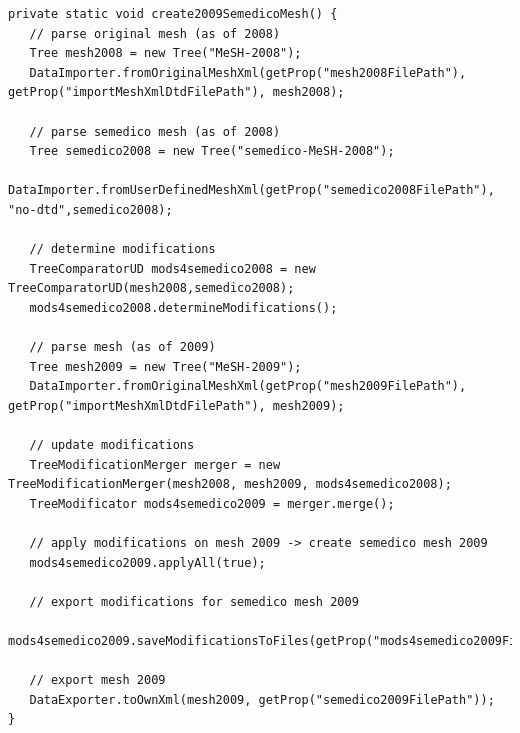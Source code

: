 \lstset{caption=Erstellen des Semedico-MeSH-2009,%
label=lst:create2009SemedicoMesh}
\begin{lstlisting}[float=htbp]
private static void create2009SemedicoMesh() {
   // parse original mesh (as of 2008)
   Tree mesh2008 = new Tree("MeSH-2008");
   DataImporter.fromOriginalMeshXml(getProp("mesh2008FilePath"), getProp("importMeshXmlDtdFilePath"), mesh2008);

   // parse semedico mesh (as of 2008)
   Tree semedico2008 = new Tree("semedico-MeSH-2008");
   DataImporter.fromUserDefinedMeshXml(getProp("semedico2008FilePath"), "no-dtd",semedico2008);

   // determine modifications
   TreeComparatorUD mods4semedico2008 = new TreeComparatorUD(mesh2008,semedico2008);
   mods4semedico2008.determineModifications();       

   // parse mesh (as of 2009)
   Tree mesh2009 = new Tree("MeSH-2009");
   DataImporter.fromOriginalMeshXml(getProp("mesh2009FilePath"), getProp("importMeshXmlDtdFilePath"), mesh2009);

   // update modifications  
   TreeModificationMerger merger = new TreeModificationMerger(mesh2008, mesh2009, mods4semedico2008);
   TreeModificator mods4semedico2009 = merger.merge();

   // apply modifications on mesh 2009 -> create semedico mesh 2009
   mods4semedico2009.applyAll(true);

   // export modifications for semedico mesh 2009       
   mods4semedico2009.saveModificationsToFiles(getProp("mods4semedico2009FilePath"));

   // export mesh 2009
   DataExporter.toOwnXml(mesh2009, getProp("semedico2009FilePath"));
}
\end{lstlisting} 



